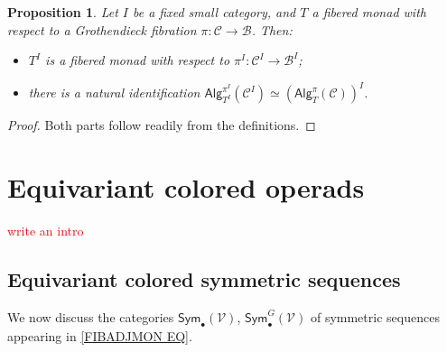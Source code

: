 \documentclass[a4paper,10pt
,draft
]{article}%
\numberwithin{equation}{section}
\numberwithin{figure}{section}
\newtheorem{proposition}[equation]{Proposition}%
\theoremstyle{definition} %
\newcommand{\V}{\ensuremath{\mathcal V}}
\newcommand{\1}{\ensuremath{\mathbbm 1}}%
\begin{document}
\begin{proposition}\label{DIAGRAMFM_PROP}
	Let $I$ be a fixed small category, and $T$ a fibered monad with respect to a Grothendieck fibration 
	$\pi \colon \mathcal{C} \to \mathcal{B}$. Then:
	\begin{itemize}
		\item[(i)] $T^I$ is a fibered monad with respect to $\pi^I\colon \mathcal{C}^I \to \mathcal{B}^I$;
		\item[(ii)] there is a natural identification 
		$\mathsf{Alg}_{T^I}^{\pi^I}(\mathcal{C}^I)
		\simeq
		\left(\mathsf{Alg}_T^{\pi}(\mathcal{C})\right)^I$.
	\end{itemize}
\end{proposition}

\begin{proof}
	Both parts follow readily from the definitions.
\end{proof}





\section{Equivariant colored operads}
\label{ECO_SEC}

\textcolor{red}{write an intro}

\subsection{Equivariant colored symmetric sequences}
\label{EQCOSYMSEQ SEC}

We now discuss the categories
$\mathsf{Sym}_{\bullet}(\V)$,
$\mathsf{Sym}^G_{\bullet}(\V)$
of symmetric sequences appearing in \eqref{FIBADJMON EQ}.
\end{document}
